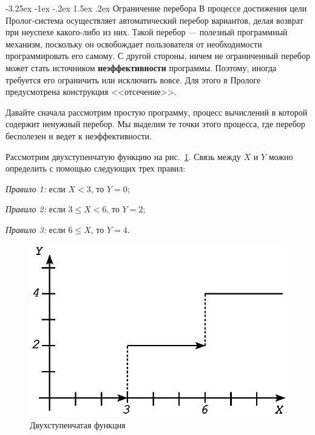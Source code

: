 \documentclass[12pt, openany, twoside]{book} %
\makeatletter
\renewcommand\section{\@startsection {section}{1}{\z@}%
                                   {-3.25ex \@plus -1ex \@minus -.2ex}%
                                   {1.5ex \@plus.2ex}%
                                   {\normalfont\large\bfseries}}
\makeatother
\begin{document}
\section{Ограничение перебора}
В процессе достижения цели Пролог-система осуществляет автоматический перебор вариантов, делая возврат при неуспехе како\-го-либо из них. Такой перебор --- полезный программный механизм, поскольку он освобождает пользователя от необходимости программировать его самому. С другой стороны, ничем не ограниченный перебор может стать источником {\bf неэффективности} программы. Поэтому, иногда требуется его ограничить или исключить вовсе. Для этого в Прологе предусмотрена конструкция <<отсечение>>.

Давайте сначала рассмотрим простую программу, процесс вычислений в которой содержит ненужный перебор. Мы выделим те точки этого процесса, где перебор бесполезен и ведет к неэффективности.

Рассмотрим двухступенчатую функцию на рис.~\ref{pic:func_step}. Связь между $X$ и $Y$ можно определить с помощью следующих трех правил:

\emph{Правило 1:} если $X < 3$, то $Y = 0$;

\emph{Правило 2:} если $3 \leq X < 6$, то $Y = 2$;

\emph{Правило 3:} если $6 \leq X$, то $Y = 4$.

\begin{figure}[ht]
\begin{center}
\includegraphics[scale=0.7]{pics/func_step.eps}
\end{center}
\caption{Двухступенчатая функция} \label{pic:func_step}
\end{figure}
\end{document}
